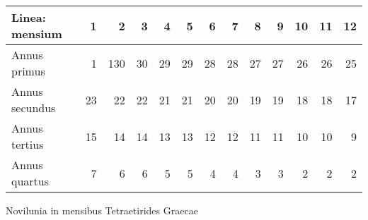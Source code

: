 %
\normalsize
\centering
\begin{tabular}{ l *{12}{r} }
Linea: mensium &
1 & 2 & 3 & 4 & 5 & 6 & 7 & 8 & 9 & 10 & 11 & 12
\\
\hline
Annus primus &
1 & 1\textbar{}30 & 30 & 29 & 29 & 28 & 28 & 27 & 27 & 26 & 26 & 25 
\\
Annus secundus &
23 & 22 & 22 &21  &21  & 20 & 20 & 19 & 19 & 18 & 18 & 17
\\
Annus tertius &
15 & 14 & 14 & 13 & 13 & 12 & 12 & 11 & 11 & 10 & 10 & 9
\\
Annus quartus &
7 & 6 & 6 & 5 & 5 & 4 & 4 & 3 & 3 & 2 & 2 & 2
\end{tabular}
%
\caption{Novilunia in mensibus Tetraetirides Graecae}
\label{tab:p027}
%
